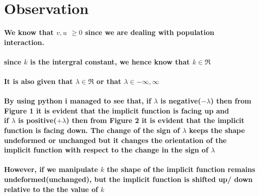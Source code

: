 \documentclass[8]{article}
\begin{document}
\pagebreak

\section*{Observation}
\textbf{We know that $v, u$ $\ge 0$ since we are dealing with population interaction. \\ \\ since $k$ is the intergral constant, we hence know that $k \in \Re$\\ \\ It is also given that $\lambda \in \Re$ or that $\lambda \in -\infty, \infty$ \\ \\ By using python i managed to see that, if $\lambda$ is negative($-\lambda$) then from Figure 1 it is evident that the implicit function is facing up and \\if $\lambda$ is positive($+\lambda$) then from Figure 2 it is evident that the implicit function is facing down. The change of the sign of $\lambda$ keeps the shape undeformed or unchanged but it changes the orientation of the implicit function with respect to the change in the sign of $\lambda$\\ \\ However, if we manipulate $k$ the shape of the implicit function remains undeformed(unchanged), but the implicit function is shifted up/ down relative to the the value of $k$}
\end{document}
